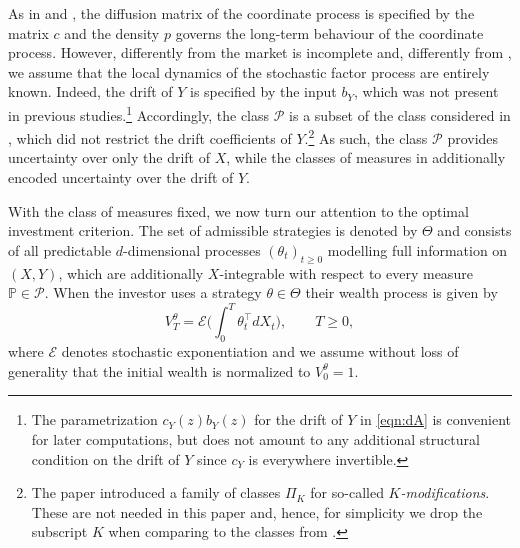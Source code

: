 \documentclass{article}
\theoremstyle{plain}
\theoremstyle{definition}
\renewcommand{\P}{\mathbb{P}}
\newcommand{\Ecal}{{\mathcal E}}
\newcommand{\Pcal}{{\mathcal P}}
\numberwithin{lem}{section}
\begin{document}
As in \cite{kardaras2021ergodic} and \cite[Section~5]{itkin2025ergodic}, the diffusion matrix of the coordinate process is specified by the matrix $c$ and the density $p$ governs the long-term behaviour of the coordinate process. However, differently from \cite{kardaras2021ergodic} the market is incomplete and, differently from \cite{itkin2025ergodic}, we assume that the local dynamics of the stochastic factor process are entirely known. Indeed, the drift of $Y$ is specified by the input $b_Y$, which was not present in previous studies.\footnote{The parametrization $c_Y(z)b_Y(z)$ for the drift of $Y$ in \eqref{eqn:dA} is convenient for later computations, but does not amount to any additional structural condition on the drift of $Y$ since $c_Y$ is everywhere invertible.} Accordingly, the class $\Pcal$ is a subset of the class considered in \cite{itkin2025ergodic}, which did not restrict the drift coefficients of $Y$.\footnote{The paper \cite{itkin2025ergodic} introduced a family of classes $\Pi_K$ for so-called \emph{$K$-modifications}. These are not needed in this paper and, hence, for simplicity we drop the subscript $K$ when comparing to the classes from \cite[Section~5.2]{itkin2025ergodic}.}
As such, the class $\Pcal$ provides uncertainty over only the drift of $X$, while the classes of measures in \cite{itkin2025ergodic} additionally encoded uncertainty over the drift of $Y$.


With the class of measures fixed, we now turn our attention to the optimal investment criterion. The set of admissible strategies is denoted by $\Theta$ and consists of all predictable $d$-dimensional processes $(\theta_t)_{t \geq 0}$ modelling full information on $(X,Y)$, which are additionally $X$-integrable with respect to every measure $\P \in \Pcal$. 
When the investor uses a strategy $\theta \in \Theta$ their wealth process is given by
\begin{equation} \label{eqn:wealth} 
V_T^\theta = \Ecal\bigg(\int_0^T \theta_t^\top dX_t\bigg), \qquad T \geq 0,
\end{equation}
where $\Ecal$ denotes stochastic exponentiation and we assume without loss of generality that the initial wealth is normalized to $V_0^\theta = 1$.
\end{document}
